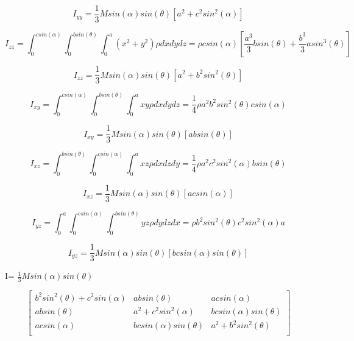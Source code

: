 \documentclass[12 pt]{article}
\begin{document}
\begin{equation*}
I_{yy}= \frac{1}{3}M sin(\alpha)sin(\theta) \left[a^{2} + c^{2}sin^{2}(\alpha) \right]
\end{equation*}


\begin{equation*}
I_{zz}=\int_{0}^{csin(\alpha)}\int_{0}^{bsin(\theta)}\int_{0}^{a} (x^{2} + y^{2})\rho dxdydz = \rho c sin(\alpha) \left[ \frac{a^{3}}{3} b sin(\theta) + \frac{b^{3}}{3}asin^{3}(\theta)\right]
\end{equation*}

\begin{equation*}
I_{zz}= \frac{1}{3}M sin(\alpha)sin(\theta) \left[a^{2} + b^{2}sin^{2}(\theta) \right]
\end{equation*}

\begin{equation*}
I_{xy} = \int_{0}^{csin(\alpha)} \int_{0}^{bsin(\theta)} \int_{0}^{a} xy \rho dx dy dz = \frac{1}{4}\rho a^{2} b^{2}sin^{2}(\theta) c sin(\alpha)   
\end{equation*}


\begin{equation*}
I_{xy} = \frac{1}{3} M sin(\alpha)sin(\theta) \left[ ab sin(\theta) \right]
\end{equation*}


\begin{equation*}
I_{xz} =  \int_{0}^{bsin(\theta)}\int_{0}^{csin(\alpha)}  \int_{0}^{a} xz \rho dx  dz dy = \frac{1}{4}\rho a^{2} c^{2} sin^{2}(\alpha) b sin(\theta)
\end{equation*}

\begin{equation*}
I_{xz} =  \frac{1}{3}M sin(\alpha)sin(\theta) \left[ ac sin(\alpha)\right]
\end{equation*}

\begin{equation*}
I_{yz} = \int_{0}^{a} \int_{0}^{csin(\alpha)} \int_{0}^{bsin(\theta)}  yz \rho  dy dz dx = \rho b^{2} sin^{2}(\theta) c^{2}sin^{2}(\alpha) a 
\end{equation*}

\begin{equation*}
I_{yz}= \frac{1}{3}M sin(\alpha)sin(\theta) \left[ bc sin(\alpha) sin(\theta)\right]
\end{equation*}

I= $ \frac{1}{3}M sin(\alpha)sin(\theta)$

\[
\begin{bmatrix}
b^{2}sin^{2}(\theta) + c^{2} sin(\alpha)& ab sin(\theta)& ac sin(\alpha)\\
ab sin(\theta)&a^{2} + c^{2}sin^{2}(\alpha) &  bc sin(\alpha) sin(\theta)\\
ac sin(\alpha)& bc sin(\alpha) sin(\theta) &a^{2} + b^{2}sin^{2}(\theta)\\
\end{bmatrix}
\]
\end{document}
